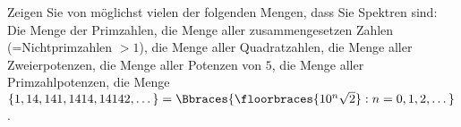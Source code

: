 
\begin{exercise}[75]

\phantom{}
	Zeigen Sie von möglichst vielen der folgenden Mengen, dass Sie Spektren sind: Die Menge der Primzahlen, die Menge aller zusammengesetzen Zahlen (=Nichtprimzahlen $> 1$), die Menge aller Quadratzahlen, die Menge aller Zweierpotenzen, die Menge aller Potenzen von $5$, die Menge aller Primzahlpotenzen, die Menge $\{1, 14, 141, 1414, 14142, \dots \} = \Bbraces{\floorbraces{10^n \sqrt{2}} : n = 0, 1, 2, \dots}$.

\end{exercise}


